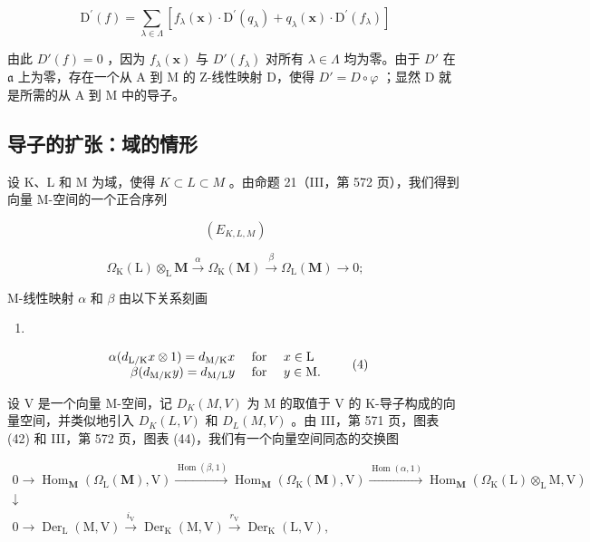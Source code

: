 \[
\mathrm{D} ^ {\prime} (f) = \sum_ {\lambda \in \Lambda} \left[ f _ {\lambda} (\mathbf {x}) \cdot \mathrm{D} ^ {\prime} (q _ {\lambda}) + q _ {\lambda} (\mathbf {x}) \cdot \mathrm{D} ^ {\prime} (f _ {\lambda}) \right]
\]

由此 \(D'(f) = 0\) ，因为 \(f_{\lambda}(\mathbf{x})\) 与 \(D'(f_{\lambda})\) 对所有 \(\lambda \in \Lambda\) 均为零。由于 \(D'\) 在 \(\mathfrak{a}\) 上为零，存在一个从 A 到 M 的 Z-线性映射 D，使得 \(D' = D \circ \varphi\) ；显然 D 就是所需的从 A 到 M 中的导子。

\subsection{导子的扩张：域的情形}

设 K、L 和 M 为域，使得 \(K \subset L \subset M\) 。由命题 21（III，第 572 页），我们得到向量 M-空间的一个正合序列

\[
(E _ {K, L, M})
\]

\[
\Omega_ {\mathrm{K}} (\mathrm{L}) \otimes_ {\mathrm{L}} \mathbf {M} \xrightarrow {\alpha} \Omega_ {\mathrm{K}} (\mathbf {M}) \xrightarrow {\beta} \Omega_ {\mathrm{L}} (\mathbf {M}) \to 0;
\]

M-线性映射 \(\alpha\) 和 \(\beta\) 由以下关系刻画

\begin{enumerate}
\def\labelenumi{(\arabic{enumi})}
\setcounter{enumi}{2}
\tightlist
\item
\end{enumerate}

\[
\begin{array}{r l} \alpha (d _ {\mathrm{L/K}} x \otimes 1) = d _ {\mathrm{M/K}} x & \text { for } \quad x \in \mathrm{L} \\ \beta (d _ {\mathrm{M/K}} y) = d _ {\mathrm{M/L}} y & \text { for } \quad y \in \mathrm{M}. \end{array}\tag{4}
\]

设 V 是一个向量 M-空间，记 \(D_{K}(M,V)\) 为 M 的取值于 V 的 K-导子构成的向量空间，并类似地引入 \(D_{K}(L,V)\) 和 \(D_{L}(M,V)\) 。由 III，第 571 页，图表 (42) 和 III，第 572 页，图表 (44)，我们有一个向量空间同态的交换图

\[
\begin{array}{l}0 \rightarrow \operatorname{Hom} _ {\mathbf {M}} (\Omega_ {\mathrm{L}} (\mathbf {M}), \mathrm{V}) \xrightarrow {\operatorname{Hom} (\beta , 1)} \operatorname{Hom} _ {\mathbf {M}} (\Omega_ {\mathrm{K}} (\mathbf {M}), \mathrm{V}) \xrightarrow {\operatorname{Hom} (\alpha , 1)} \operatorname{Hom} _ {\mathbf {M}} (\Omega_ {\mathrm{K}} (\mathrm{L}) \otimes_ {\mathrm{L}} \mathrm{M}, \mathrm{V})\\\downarrow\\0 \rightarrow \operatorname{Der} _ {\mathrm{L}} (\mathrm{M}, \mathrm{V}) \xrightarrow {i _ {\mathrm{V}}} \operatorname{Der} _ {\mathrm{K}} (\mathrm{M}, \mathrm{V}) \xrightarrow {r _ {\mathrm{V}}} \operatorname{Der} _ {\mathrm{K}} (\mathrm{L}, \mathrm{V}),\end{array}
\]

